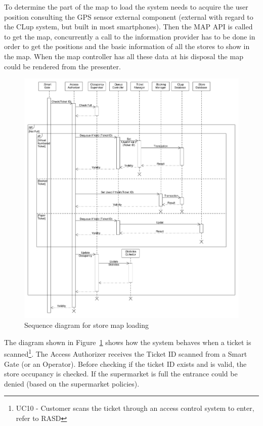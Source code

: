To determine the part of the map to load the system needs to acquire the user position consulting the GPS sensor external component (external with regard to the CLup system, but built in most smartphones). Then the MAP API is called to get the map, concurrently a call to the information provider has to be done in order to get the positions and the basic information of all the stores to show in the map. When the map controller has all these data at his disposal the map could be rendered from the presenter. 
\begin{figure}[H]
    \includegraphics[width=1.1\textwidth]{Images/UML_ticket_scan_sequence.pdf}
    \caption{\label{fig:UML_ticket_scan_sequence}Sequence diagram for store map loading}
\end{figure}
The diagram shown in Figure~\ref{fig:UML_ticket_scan_sequence} shows how the system behaves when a ticket is scanned\footnote{UC10 - Customer scans the ticket through an access control system to enter, refer to RASD}. The Access Authorizer receives the Ticket ID scanned from a Smart Gate (or an Operator). Before checking if the ticket ID exists and is valid, the store occupancy is checked. If the supermarket is full the entrance could be denied (based on the supermarket policies). 

